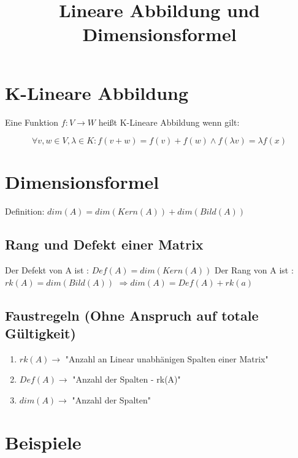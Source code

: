 \documentclass[12pt]{article}
\begin{document}
    \title{Lineare Abbildung und Dimensionsformel}
    \maketitle


    \section{K-Lineare Abbildung}
    Eine Funktion  $f:V\rightarrow W$ \nolinebreak heißt K-Lineare Abbildung wenn gilt:

    \[\forall v,w\in V, \lambda \in K : f(v+w) = f(v) + f(w) \wedge f(\lambda v) = \lambda f(x)\]


    \section{Dimensionsformel}
    Definition: $dim(A)=dim(Kern(A))+dim(Bild(A))$

    \subsection{Rang und Defekt einer Matrix}

    Der Defekt von A ist : $Def(A) = dim(Kern(A))$ \newline
    \newline
    Der Rang von A ist : $rk(A)=dim(Bild(A))$ \newline
    \newline
    $\Rightarrow dim(A)=Def(A)+rk(a)$

    \subsection{Faustregeln (Ohne Anspruch auf totale Gültigkeit)}

    \begin{enumerate}
        \item $rk(A)\rightarrow$ "Anzahl an Linear unabhänigen Spalten einer Matrix"
        \item $Def(A) \rightarrow$ "Anzahl der Spalten - rk(A)"
        \item $dim(A) \rightarrow $ "Anzahl der Spalten"
    \end{enumerate}

    \newpage


    \section{Beispiele}
\end{document}
